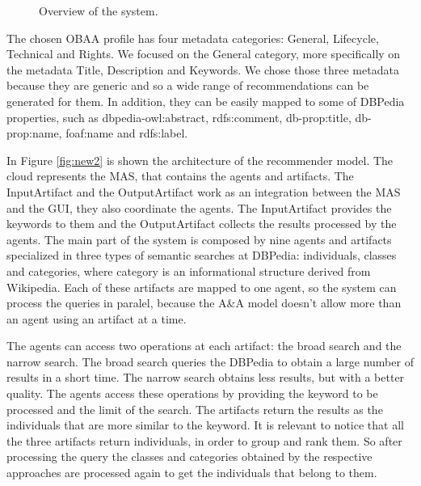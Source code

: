 \documentclass[a4paper,twoside]{article}
\begin{document}
\begin{figure}[!h]
  \centering
   {}
  \caption{Overview of the system.}
  \label{fig:new1}
 \end{figure}

The chosen OBAA profile has four metadata categories: General, Lifecycle, Technical and Rights. We focused on the General category, more specifically on the metadata Title, Description and Keywords. We chose those three metadata because they are generic and so a wide range of recommendations can be generated for them. In addition, they can be easily mapped to some of DBPedia properties, such as dbpedia-owl:abstract,  rdfs:comment, db-prop:title, db-prop:name, foaf:name and rdfs:label.

In Figure \ref{fig:new2} is shown the architecture of the recommender model. The cloud represents the MAS, that contains the agents and artifacts. The InputArtifact and the OutputArtifact work as an integration between the MAS and the GUI, they also coordinate the agents. The InputArtifact provides the keywords to them and the OutputArtifact collects the results processed by the agents. The main part of the system is composed by nine agents and artifacts specialized in three types of semantic searches at DBPedia: individuals, classes and categories, where category is an informational structure derived from Wikipedia. Each of these artifacts are mapped to one agent, so the system can process the queries in paralel, because the A\&A model doesn't allow more than an agent using an artifact at a time.

\begin{figure*}[!h]
  \centering
   {}
  \caption{Overview of the recommender model.}
  \label{fig:new2}
 \end{figure*}

The agents can access two operations at each artifact: the broad search and the narrow search. The broad search queries the DBPedia to obtain a large number of results in a short time. The narrow search obtains less results, but with a better quality. The agents access these operations by providing the keyword to be processed and the limit of the search. The artifacts return the results as the individuals that are more similar to the keyword. It is relevant to notice that all the three artifacts return individuals, in order to group and rank them. So after processing the query the classes and categories obtained by the respective approaches are processed again to get the individuals that belong to them.
\end{document}
